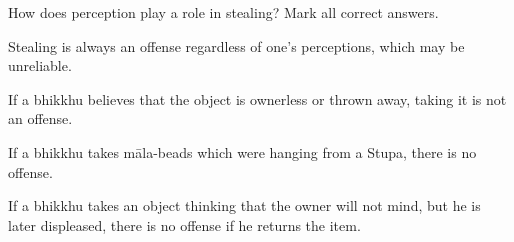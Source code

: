 \begin{exam}{\autoExamName}
\begin{problem}
\end{problem}

\problemDivide

\begin{problem}

  How does perception play a role in stealing? Mark all correct answers.

\bigskip

\begin{manswers}{1}
    \bChoices

     Stealing is always an offense regardless of one's perceptions, which may be unreliable. \eAns

     If a bhikkhu believes that the object is ownerless or thrown away, taking it is not an offense. \eAns

     If a bhikkhu takes māla-beads which were hanging from a Stupa, there is no offense. \eAns

     If a bhikkhu takes an object thinking that the owner will not mind, but he is later displeased, there is no offense if he returns the item. \eAns

    \eChoices
\end{manswers}

\end{problem}

\end{exam}









